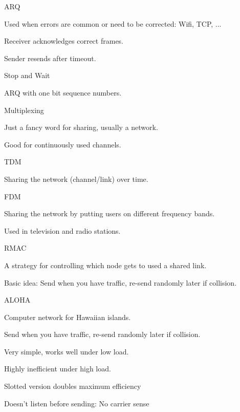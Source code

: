 \documentclass[main.tex]{subfiles}
\begin{document}
\begin{card}{ARQ}
\item Used when errors are common or need to be corrected: Wifi, TCP, ...
\item Receiver acknowledges correct frames.
\item Sender resends after timeout.
\end{card}

\begin{card}{Stop and Wait}
\item ARQ with one bit sequence numbers.
\end{card}

\begin{card}{Multiplexing}
\item Just a fancy word for sharing, usually a network.
\item Good for continuously used channels.
\end{card}

\begin{card}{TDM}
\item Sharing the network (channel/link) over time.
\end{card}

\begin{card}{FDM}
\item Sharing the network by putting users on different frequency bands.
\item Used in television and radio stations.
\end{card}

\begin{card}{RMAC}
\item A strategy for controlling which node gets to used a shared link.
\item Basic idea: Send when you have traffic, re-send randomly later if collision.
\end{card}

\begin{card}{ALOHA}
\item Computer network for Hawaiian islands.
\item Send when you have traffic, re-send randomly later if collision.
\item Very simple, works well under low load.
\item Highly inefficient under high load.
\item Slotted version doubles maximum efficiency
\item Doesn't listen before sending: No carrier sense
\end{card}
\end{document}
